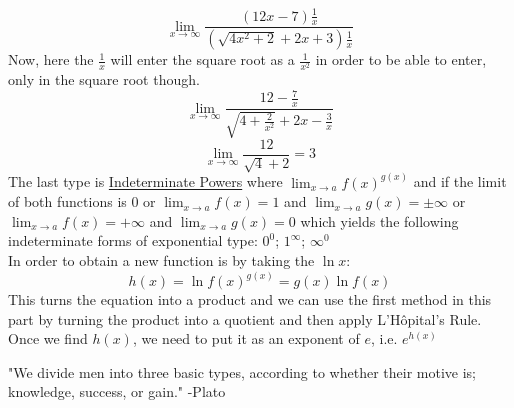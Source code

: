 \documentclass[12pt, letterpaper]{article}
\begin{document}
\[\lim_{x \to \infty} \frac{(12x-7)\frac{1}{x}}{(\sqrt{4x^2+2} + 2x+3)\frac{1}{x}}\]
Now, here the \(\frac{1}{x}\) will enter the square root as a \(\frac{1}{x^2}\) in order to be able to enter, only in the square root though.
\[\lim_{x \to \infty} \frac{12-\frac{7}{x}}{\sqrt{4+\frac{2}{x^2}} + 2x-\frac{3}{x}}\]
\[\lim_{x \to \infty} \frac{12}{\sqrt{4}+2} = 3\]
The last type is \underline{Indeterminate Powers} where \(\lim_{x \to a} f(x)^{g(x)}\) and if the limit of both functions is \(0\) or \(\lim_{x \to a} f(x) = 1\) and \(\lim_{x \to a} g(x) = \pm \infty\) or \(\lim_{x \to a} f(x) = +\infty\) and \(\lim_{x \to a} g(x) = 0\) which yields the following indeterminate forms of exponential type: \(0^0\); \(1^\infty\); \(\infty^0\)\\
\newline
In order to obtain a new function is by taking the \(\ln{x}\):
\[h(x) = \ln{f(x)^{g(x)}} = g(x)\ln{f(x)}\]
This turns the equation into a product and we can use the first method in this part by turning the product into a quotient and then apply L'Hôpital's Rule. Once we find \(h(x)\), we need to put it as an exponent of \(e\), i.e. \(e^{h(x)}\)

"We divide men into three basic types, according to whether their motive is; knowledge, success, or gain."
-Plato
 
\end{document}
